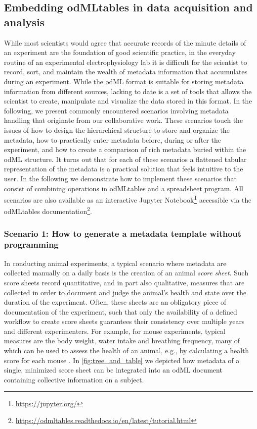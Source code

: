 {\subsection{Embedding odMLtables in data acquisition and analysis}
\label{sec:Illustrative-Examples}

While most scientists would agree that accurate records of the minute details of an experiment are the foundation of good scientific practice, in the everyday routine of an experimental electrophysiology lab it is difficult for the scientist to record, sort, and maintain the wealth of metadata information that accumulates during an experiment. While the odML format is suitable for storing metadata information from different sources, lacking to date is a set of tools that allows the scientist to create, manipulate and visualize the data stored in this format. In the following, we present commonly encountered scenarios involving metadata handling that originate from our collaborative work. These scenarios touch the issues of how to design the hierarchical structure to store and organize the metadata, how to practically enter metadata before, during or after the experiment, and how to create a comparison of rich metadata buried within the odML structure. It turns out that for each of these scenarios a flattened tabular representation of the metadata is a practical solution that feels intuitive to the user. In the following we demonstrate how to implement these scenarios that consist of combining operations in odMLtables and a spreadsheet program. All scenarios are also available as an interactive Jupyter Notebook\footnote{\url{https://jupyter.org/}} accessible via the odMLtables documentation\footnote{\url{https://odmltables.readthedocs.io/en/latest/tutorial.html}}.

\subsubsection*{Scenario 1: How to generate a metadata template without programming}
\label{sec:Template-Generation}
In conducting animal experiments, a typical scenario where metadata are collected manually on a daily basis is the creation of an animal \textit{score sheet}. Such score sheets record quantitative, and in part also qualitative, measures that are collected in order to document and judge the animal's health and state over the duration of the experiment. Often, these sheets are an obligatory piece of documentation of the experiment, such that only the availability of a defined workflow to create score sheets guarantees their consistency over multiple years and different experimenters. For example, for mouse experiments, typical measures are the body weight, water intake and breathing frequency, many of which can be used to assess the health of an animal, e.g., by calculating a health score for each mouse \citep{Foltz_1999, Burkholder_2012}. In \cref{fig:tree_and_table} we depicted how metadata of a single, minimized score sheet can be integrated into an odML document containing collective information on a subject.

}
